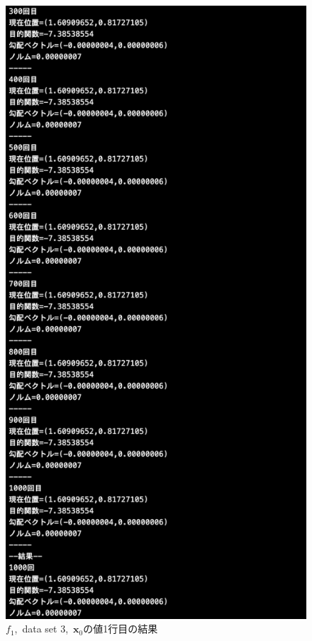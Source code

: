 \documentclass[12pt]{jarticle}
\begin{document}
\begin{figure}[h]
\begin{minipage}{0.5\hsize}
    \end{minipage}
    \begin{minipage}{0.5\hsize}
        \begin{center}
            \includegraphics[scale=0.2]{kadai1_1s_out3_1_3.png}
        \end{center}
    \end{minipage}
    \caption{$f_1$,\ data set 3,\ $\boldsymbol{x}_0$の値1行目の結果}
\end{figure}
\end{document}

